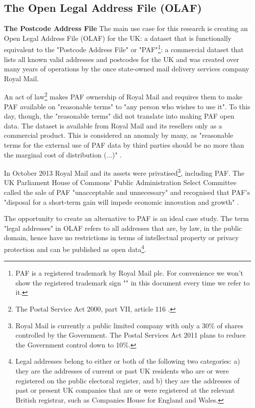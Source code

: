 \subsection{The Open Legal Address File (OLAF)}
\label{subs:the-problem-of-creating-an-olaf}

\textbf{The Postcode Address File} The main use case for this research is creating an Open Legal Address File (OLAF) for the UK: a dataset that is functionally equivalent to the "Postcode Address File" or "PAF"\footnote{PAF is a registered trademark by Royal Mail plc. For convenience we won't show the registered trademark sign "\textregistered" in this document every time we refer to it.}: a commercial dataset that lists all known valid addresses and postcodes for the UK and was created over many years of operations by the once state-owned mail delivery services company Royal Mail.

An act of law\footnote{The Postal Service Act 2000, part VII, article 116 \cite{postalserviceact2000}.} makes PAF ownership of Royal Mail and requires them to make PAF available on "reasonable terms" to "any person who wishes to use it". To this day, though, the "reasonable terms" did not translate into making PAF open data. The dataset is available from Royal Mail and its resellers only as a commercial product. This is considered an anomaly by many, as "reasonable terms for the external use of PAF data by third parties should be no more than the marginal cost of distribution (...)" \cite{odugresponse}. 

In October 2013 Royal Mail and its assets were privatised\footnote{Royal Mail is currently a public limited company with only a 30\% of shares controlled by the Government. The Postal Services Act 2011 \cite{postalserviceact2011} plans to reduce the Government control down to 10\%.}, including PAF. The UK Parliament House of Commons' Public Administration Select Committee called the sale of PAF "unacceptable and unnecessary" and recognised that PAF's "disposal for a short-term gain will impede economic innovation and growth" \cite{pascod}.

The opportunity to create an alternative to PAF is an ideal case study. The term "legal addresses" in OLAF refers to all addresses that are, by law, in the public domain, hence have no restrictions in terms of intellectual property or privacy protection and can be published as open data\footnote{Legal addresses belong to either or both of the following two categories: a) they are the addresses of current or past UK residents who are or were registered on the public electoral register, and b) they are the addresses of past or present UK companies that are or were registered at the relevant British registrar, such as Companies House for England and Wales.}.

